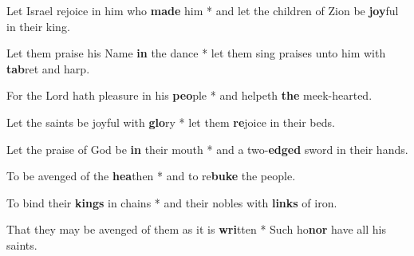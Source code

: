 \begin{multicols}{2}
	Let Israel rejoice in him who \textbf{made} him * and let the children of Zion be \textbf{joy}ful in their king.
	
	Let them praise his Name \textbf{in} the dance * let them sing praises unto him with \textbf{tab}ret and harp.
	
	For the Lord hath pleasure in his \textbf{peo}ple * and helpeth \textbf{the} meek-hearted.
	
	Let the saints be joyful with \textbf{glo}ry * let them \textbf{re}joice in their beds.
	
	Let the praise of God be \textbf{in} their mouth * and a two-\textbf{edged} sword in their hands.
	
	To be avenged of the \textbf{hea}then * and to re\textbf{buke} the people.
	
	To bind their \textbf{kings} in chains * and their nobles with \textbf{links} of iron.
	
	That they may be avenged of them as it is \textbf{wri}tten * Such ho\textbf{nor} have all his saints.
\end{multicols}